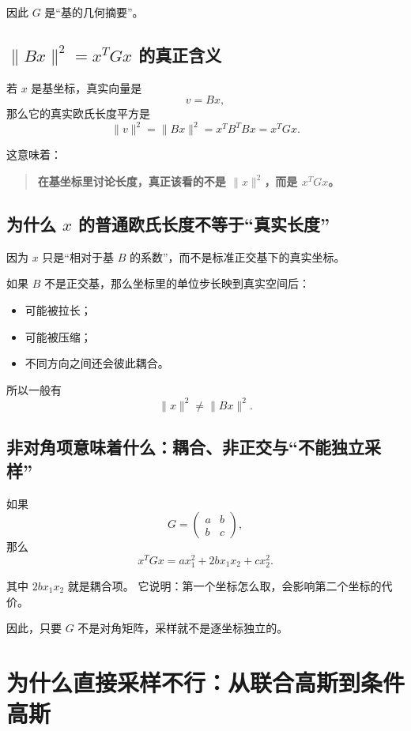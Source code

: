 \documentclass[11pt,a4paper]{ctexart}
\begin{document}
因此 \(G\) 是“基的几何摘要”。

\subsection{\(\|Bx\|^2=x^T G x\) 的真正含义}

若 \(x\) 是基坐标，真实向量是
\[
v=Bx,
\]
那么它的真实欧氏长度平方是
\[
\|v\|^2=\|Bx\|^2=x^T B^T B x=x^T G x.
\]

这意味着：

\begin{quote}
\textbf{在基坐标里讨论长度，真正该看的不是 \(\|x\|^2\)，而是 \(x^T G x\)。}
\end{quote}

\subsection{为什么 \(x\) 的普通欧氏长度不等于“真实长度”}

因为 \(x\) 只是“相对于基 \(B\) 的系数”，而不是标准正交基下的真实坐标。

如果 \(B\) 不是正交基，那么坐标里的单位步长映到真实空间后：

\begin{itemize}
    \item 可能被拉长；
    \item 可能被压缩；
    \item 不同方向之间还会彼此耦合。
\end{itemize}

所以一般有
\[
\|x\|^2 \neq \|Bx\|^2.
\]

\subsection{非对角项意味着什么：耦合、非正交与“不能独立采样”}

如果
\[
G=
\begin{pmatrix}
a & b\\
b & c
\end{pmatrix},
\]
那么
\[
x^T G x=ax_1^2+2bx_1x_2+cx_2^2.
\]

其中 \(2bx_1x_2\) 就是耦合项。  
它说明：第一个坐标怎么取，会影响第二个坐标的代价。

因此，只要 \(G\) 不是对角矩阵，采样就不是逐坐标独立的。

\section{为什么直接采样不行：从联合高斯到条件高斯}
\end{document}
